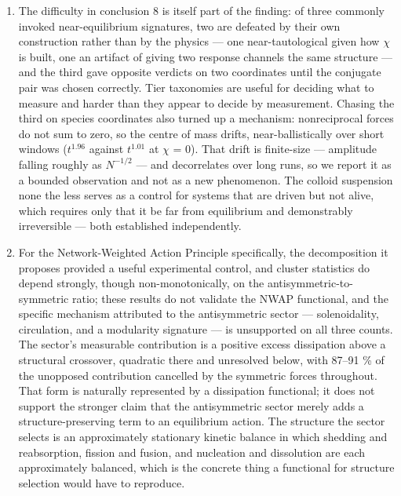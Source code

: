 \documentclass[aps,pre,preprint,superscriptaddress,nofootinbib,longbibliography]{revtex4-2}
\begin{document}
\begin{enumerate}
\item The difficulty in conclusion 8 is itself part of the finding: of three commonly invoked near-equilibrium signatures, two are defeated by their own construction rather than by the physics --- one near-tautological given how $\chi$ is built, one an artifact of giving two response channels the same structure --- and the third gave opposite verdicts on two coordinates until the conjugate pair was chosen correctly. Tier taxonomies are useful for deciding what to measure and harder than they appear to decide by measurement. Chasing the third on species coordinates also turned up a mechanism: nonreciprocal forces do not sum to zero, so the centre of mass drifts, near-ballistically over short windows ($t^{1.96}$ against $t^{1.01}$ at $\chi$ = 0). That drift is finite-size --- amplitude falling roughly as $N^{-1/2}$ --- and decorrelates over long runs, so we report it as a bounded observation and not as a new phenomenon. The colloid suspension none the less serves as a control for systems that are driven but not alive, which requires only that it be far from equilibrium and demonstrably irreversible --- both established independently.
\item For the Network-Weighted Action Principle specifically, the decomposition it proposes provided a useful experimental control, and cluster statistics do depend strongly, though non-monotonically, on the antisymmetric-to-symmetric ratio; these results do not validate the NWAP functional, and the specific mechanism attributed to the antisymmetric sector --- solenoidality, circulation, and a modularity signature --- is unsupported on all three counts. The sector's measurable contribution is a positive excess dissipation above a structural crossover, quadratic there and unresolved below, with 87--91 \% of the unopposed contribution cancelled by the symmetric forces throughout. That form is naturally represented by a dissipation functional; it does not support the stronger claim that the antisymmetric sector merely adds a structure-preserving term to an equilibrium action. The structure the sector selects is an approximately stationary kinetic balance in which shedding and reabsorption, fission and fusion, and nucleation and dissolution are each approximately balanced, which is the concrete thing a functional for structure selection would have to reproduce.

\end{enumerate}
\end{document}
